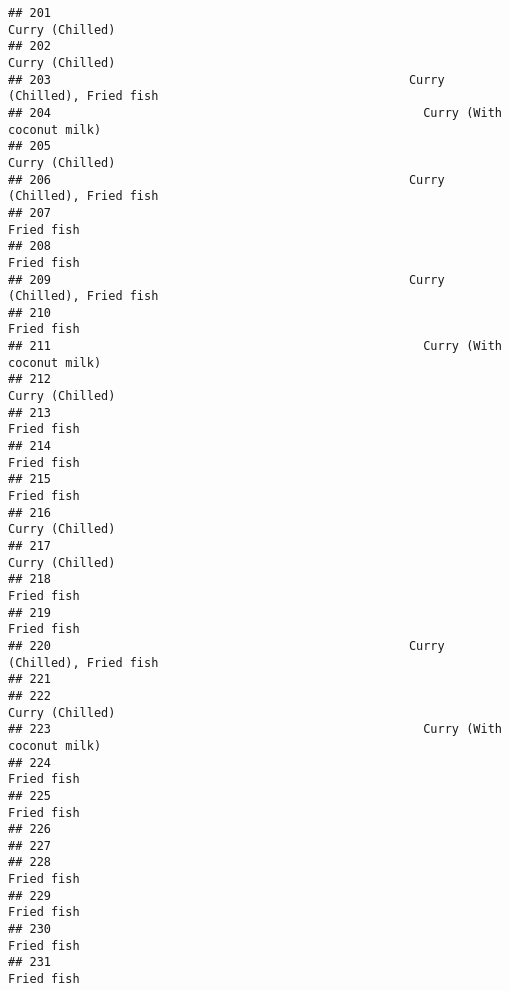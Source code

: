 \documentclass[
]{article}
\begin{document}
\begin{verbatim}
## 201                                                              Curry (Chilled)
## 202                                                              Curry (Chilled)
## 203                                                  Curry (Chilled), Fried fish
## 204                                                    Curry (With coconut milk)
## 205                                                              Curry (Chilled)
## 206                                                  Curry (Chilled), Fried fish
## 207                                                                   Fried fish
## 208                                                                   Fried fish
## 209                                                  Curry (Chilled), Fried fish
## 210                                                                   Fried fish
## 211                                                    Curry (With coconut milk)
## 212                                                              Curry (Chilled)
## 213                                                                   Fried fish
## 214                                                                   Fried fish
## 215                                                                   Fried fish
## 216                                                              Curry (Chilled)
## 217                                                              Curry (Chilled)
## 218                                                                   Fried fish
## 219                                                                   Fried fish
## 220                                                  Curry (Chilled), Fried fish
## 221                                                                             
## 222                                                              Curry (Chilled)
## 223                                                    Curry (With coconut milk)
## 224                                                                   Fried fish
## 225                                                                   Fried fish
## 226                                                                             
## 227                                                                             
## 228                                                                   Fried fish
## 229                                                                   Fried fish
## 230                                                                   Fried fish
## 231                                                                   Fried fish

\end{verbatim}
\end{document}
